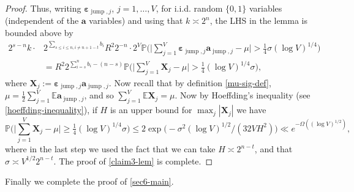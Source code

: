 \documentclass[11pt,reqno]{amsart}
\numberwithin{equation}{section}
\theoremstyle{definition}
\theoremstyle{remark}
\newcommand{\mb}{\mathbb}
\newcommand{\mbf}{\mathbf}
\newcommand{\eps}{\varepsilon}
\def\boldeps{\boldsymbol\eps}
\renewcommand{\le}{\leqslant}
\renewcommand{\ge}{\geqslant}
\newcommand\jump{\operatorname{jump}}
\begin{document}
\begin{proof}
Thus, writing $\boldeps_{\jump,j}$, $j = 1,\dots, V$, for i.i.d. random $\{0,1\}$ variables (independent of the $\mbf{a}$ variables) and using that $k \asymp 2^n$, the LHS in the lemma is bounded above by
\begin{align}\nonumber 2^{s - n}k \cdot & 2^{\sum_{s \le i \le n, i \ne n +1 - t} b_i}  R^2 2^{-n} \cdot 2^V \mb{P} \big( \big| \sum_{j = 1}^V \boldeps_{\jump,j} \mathbf{a}_{\jump,j} - \mu\big| > \tfrac{1}{4}\sigma (\log V)^{1/4} \big) \\ &  = R^2 2^{\sum_{i = s}^n b_i - (n - s)} \mb{P} \big( \big| \sum_{j = 1}^V \mbf{X}_j - \mu\big| > \tfrac{1}{4} (\log V)^{1/4} \sigma\big),\label{63-a1} \end{align} where $\mbf{X}_j := \boldeps_{\jump, j} \mbf{a}_{\jump, j}$.
Now recall that by definition \cref{mu-sig-def}, $\mu = \frac{1}{2}\sum_{j = 1}^V \mb{E} \mbf{a}_{\jump, j}$, and so $\sum_{j = 1}^V \mb{E}\mbf{X}_j = \mu$. Now by Hoeffding's inequality (see \cref{hoeffding-inequality}), if $H$ is an upper bound for $\max_j |\mbf{X}_j|$ we have
\[ \mb{P} \big( \big|\sum_{j = 1}^V \mbf{X}_j - \mu \big| \ge \tfrac{1}{4}(\log V)^{1/4} \sigma\big) \le 2 \exp \big(-\sigma^2(\log V)^{1/2}/(32VH^2)\big) \ll e^{-\Omega((\log V)^{1/2})},\]
where in the last step we used the fact that we can take $H \asymp 2^{n - t}$, and that $\sigma \asymp V^{1/2} 2^{n - t}$. The proof of \cref{claim3-lem} is complete.
\end{proof}

Finally we complete the proof of \cref{sec6-main}. 
\end{document}
